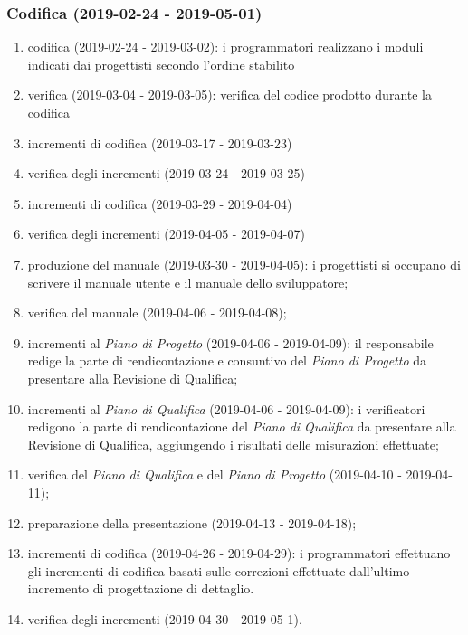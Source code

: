 		\subsubsection{Codifica (2019-02-24 - 2019-05-01)}
			\begin{enumerate}[label= 4.2.\arabic*)]
				\item codifica (2019-02-24 - 2019-03-02): i programmatori realizzano i moduli indicati dai progettisti secondo l'ordine stabilito
				\item verifica (2019-03-04 - 2019-03-05): verifica del codice prodotto durante la codifica
				\item incrementi di codifica (2019-03-17 - 2019-03-23)
				\item verifica degli incrementi (2019-03-24 - 2019-03-25)
				\item incrementi di codifica (2019-03-29 - 2019-04-04)
				\item verifica degli incrementi (2019-04-05 - 2019-04-07)
				\item produzione del manuale (2019-03-30 - 2019-04-05): i progettisti si occupano di scrivere il manuale utente e il manuale dello sviluppatore;
				\item verifica del manuale (2019-04-06 - 2019-04-08);
				\item incrementi al \textit{Piano di Progetto} (2019-04-06 - 2019-04-09): il responsabile redige la parte di rendicontazione e consuntivo del \textit{Piano di Progetto} da presentare alla Revisione di Qualifica;
				\item incrementi al \textit{Piano di Qualifica} (2019-04-06 - 2019-04-09): i verificatori redigono la parte di rendicontazione del \textit{Piano di Qualifica} da presentare alla Revisione di Qualifica, aggiungendo i risultati delle misurazioni effettuate;
				\item verifica del \textit{Piano di Qualifica} e del \textit{Piano di Progetto} (2019-04-10 - 2019-04-11);
				\item preparazione della presentazione (2019-04-13 - 2019-04-18);
				\item incrementi di codifica (2019-04-26 - 2019-04-29): i programmatori effettuano gli incrementi di codifica basati sulle correzioni effettuate dall'ultimo incremento di progettazione di dettaglio.
				\item verifica degli incrementi (2019-04-30 - 2019-05-1).
			\end{enumerate}
			
